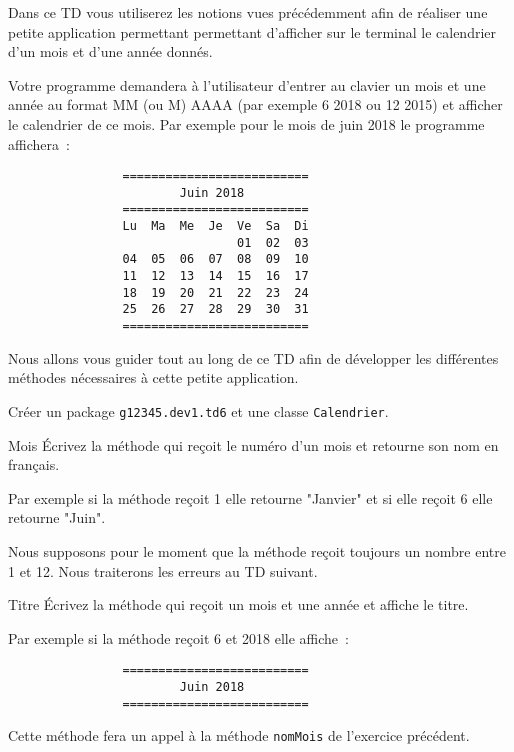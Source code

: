 \documentclass[a4paper,11pt]{article}
\date{2018 -- 2019}
\begin{document}
\entete
\titre
{}
\lastedit


	Dans ce TD vous utiliserez les notions vues précédemment afin de réaliser 
	une petite application permettant permettant d'afficher sur le terminal 
	le calendrier d'un mois et d'une année donnés. 
	
	Votre programme demandera à l'utilisateur d'entrer au clavier un mois et une année 
au format MM (ou M) AAAA (par exemple 6 2018 ou 12 2015) et afficher le calendrier de ce mois.
Par exemple pour le mois de juin 2018 le programme affichera~: 

\begin{verbatim}
                ==========================
                        Juin 2018
                ========================== 
                Lu  Ma  Me  Je  Ve  Sa  Di
                                01  02  03   
                04  05  06  07  08  09  10   
                11  12  13  14  15  16  17   
                18  19  20  21  22  23  24   
                25  26  27  28  29  30  31      
                ==========================
\end{verbatim}

\vspace{0.5cm}


Nous allons vous guider tout au long de ce TD afin de développer les différentes méthodes nécessaires à cette petite application.


		Créer un package \texttt{g12345.dev1.td6} et une classe \texttt{Calendrier}.


 	\begin{Exercice}{Mois}
		\'Ecrivez la méthode  qui reçoit le numéro d'un mois et retourne son nom en français.
		
		Par exemple si la méthode reçoit 1 elle retourne "Janvier" et si elle reçoit 6 elle retourne "Juin".
		
		Nous supposons pour le moment que la méthode reçoit toujours un nombre entre 1 et 12.
		Nous traiterons les erreurs au TD suivant.
	\end{Exercice} 

 
 	\begin{Exercice}{Titre}
		\'Ecrivez la méthode  qui reçoit un mois et une année
		et affiche le titre. 
		
		Par exemple si la méthode reçoit 6 et 2018 elle affiche~:
		\begin{verbatim}
                ==========================
                        Juin 2018
                ========================== 
		\end{verbatim}	
		
		Cette méthode fera un appel à la méthode \texttt{nomMois} de l'exercice précédent.
	\end{Exercice} 
\end{document}
